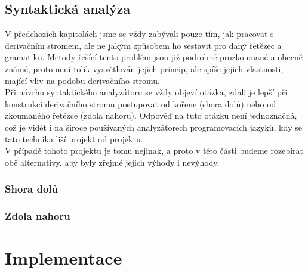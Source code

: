 \section{Syntaktická analýza}
V předchozích kapitolách jsme se vždy zabývali pouze tím, jak pracovat s derivačním stromem,
ale ne jakým způsobem ho sestavit pro daný řetězec a gramatiku.
Metody řešící tento problém jsou již podrobně prozkoumané a obecně známé,
proto není tolik vysvětlován jejich princip, ale spíše jejich vlastnosti, mající
vliv na podobu derivačního stromu.\\

Při návrhu syntaktického analyzátoru se vždy objeví otázka, zdali je lepší
při konstrukci derivačního stromu postupovat od kořene (shora dolů) nebo od
zkoumaného řetězce (zdola nahoru). Odpověď na tuto otázku není jednoznačná,
což je vidět i na široce používaných analyzátorech programovacích jazyků,
kdy se tato technika liší projekt od projektu.\\

V případě tohoto projektu je tomu nejinak, a proto v této části budeme rozebírat
obě alternativy, aby byly zřejmé jejich výhody i nevýhody.

\subsection{Shora dolů}

\subsection{Zdola nahoru}
\chapter{Implementace}

